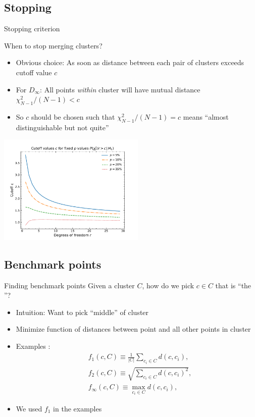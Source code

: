 \subsection{Stopping}
\begin{frame}{Stopping criterion}
	\begin{block}{When to stop merging clusters?}
		\begin{itemize}
			\item Obvious choice: As soon as distance between each pair of clusters exceeds cutoff value $c$ 
			\item For $D_\infty$: All points \emph{within} cluster will have mutual distance $\chi^2_{N-1}/(N-1) < c$
			\item So $c$ should be chosen such that $\chi^2_{N-1}/(N-1)=c$ means \enquote{almost distinguishable but not quite}
		\end{itemize}
	{\centering
	\includegraphics[width=7cm,clip,trim=0cm 0cm 0cm 0.75cm]{figures/erratum-plots/cutoff_values.pdf}\par}
	\end{block}
\end{frame}
%
\subsection{Benchmark points}
\begin{frame}{Finding benchmark points}
	Given a cluster $C$, how do we pick $c\in C$ that is \enquote{the }?
	\begin{itemize}
		\item Intuition: Want to pick \enquote{middle} of cluster
		\item Minimize function of distances between point and all other points in cluster
		\item Examples :
		\begin{align*}%
		&f_1(c, C) \equiv \frac 1{|C|}\sum_{c_i\in C} d(c, c_i),\\
		&f_2(c, C) \equiv \sqrt{\sum_{c_i\in C} d(c, c_i)^2},\\
		&f_\infty(c, C) \equiv \max_{c_i\in C} d(c, c_i),
		\end{align*}
		\item We used $f_1$ in the examples
	\end{itemize}
	
	
\end{frame}
%